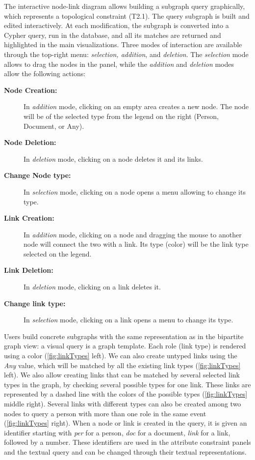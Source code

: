 The interactive node-link diagram allows building a subgraph query graphically, which represents a topological constraint (T2.1).
The query subgraph is built and edited interactively.
At each modification, the subgraph is converted into a Cypher query, run in the database, and all its matches are returned and highlighted in the main visualizations.
Three modes of interaction are available through the top-right menu: \textit{selection, addition}, and \textit{deletion}.
The \textit{selection} mode allows to drag the nodes in the panel, while the \textit{addition} and \textit{deletion} modes allow the following actions:
\begin{description}
    \item[\textbf{Node Creation:}] In \textit{addition} mode, clicking on an empty area creates a new node. The node will be of the selected type from the legend on the right (Person, Document, or Any).
    \item[\textbf{Node Deletion:}] In \textit{deletion} mode, clicking on a node deletes it and its links.
    \item[\textbf{Change Node type:}]  In \textit{selection} mode, clicking on a node opens a menu allowing to change its type.
    \item[\textbf{Link Creation:}] In \textit{addition} mode, clicking on a node and dragging the mouse to another node will connect the two with a link. Its type (color) will be the link type selected on the legend.
    \item[\textbf{Link Deletion:}] In \textit{deletion} mode, clicking on a link deletes it.
    \item[\textbf{Change link type:}] In \textit{selection} mode, clicking on a link opens a menu to change its type.
\end{description}

Users build concrete subgraphs with the same representation as in the bipartite graph view: a visual query is a graph template.
Each role (link type) is rendered using a color (\autoref{fig:linkTypes} left).
We can also create untyped links using the \textit{Any} value, which will be matched by all the existing link types (\autoref{fig:linkTypes} left).
We also allow creating links that can be matched by several selected link types in the graph, by checking several possible types for one link.
These links are represented by a dashed line with the colors of the possible types (\autoref{fig:linkTypes} middle right).
Several links with different types can also be created among two nodes to query a person with more than one role in the same event (\autoref{fig:linkTypes} right).
When a node or link is created in the query, it is given an identifier starting with \emph{per} for a person, \emph{doc} for a document, \emph{link} for a link, followed by a number.
These identifiers are used in the attribute constraint panels and the textual query and can be changed through their textual representations.


